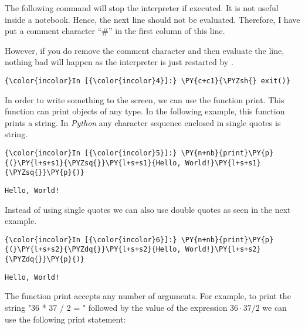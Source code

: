 The following command will stop the interpreter if executed. It is not
useful inside a  notebook. 
Hence, the next line should not be evaluated. Therefore, I have put a
comment character ``\#'' in the first column of this line.

However, if you do remove the comment character and then evaluate the
line, nothing bad will happen as the interpreter is just restarted by
.

\begin{Verbatim}[commandchars=\\\{\}]
{\color{incolor}In [{\color{incolor}4}]:} \PY{c+c1}{\PYZsh{} exit()}
\end{Verbatim}

In order to write something to the screen, we can use the function
print. This function can print objects of any type. In the following
example, this function prints a string. In \textsl{Python} any character
sequence enclosed in single quotes is string.

\begin{Verbatim}[commandchars=\\\{\}]
{\color{incolor}In [{\color{incolor}5}]:} \PY{n+nb}{print}\PY{p}{(}\PY{l+s+s1}{\PYZsq{}}\PY{l+s+s1}{Hello, World!}\PY{l+s+s1}{\PYZsq{}}\PY{p}{)}
\end{Verbatim}


\begin{Verbatim}[commandchars=\\\{\}]
Hello, World!
\end{Verbatim}

Instead of using single quotes we can also use double quotes as seen in
the next example.

\begin{Verbatim}[commandchars=\\\{\}]
{\color{incolor}In [{\color{incolor}6}]:} \PY{n+nb}{print}\PY{p}{(}\PY{l+s+s2}{\PYZdq{}}\PY{l+s+s2}{Hello, World!}\PY{l+s+s2}{\PYZdq{}}\PY{p}{)}
\end{Verbatim}


\begin{Verbatim}[commandchars=\\\{\}]
Hello, World!
\end{Verbatim}

The function print accepts any number of arguments. For example, to
print the string "36 * 37 / 2 = " followed by the value of the
expression \(36 \cdot 37 / 2\) we can use the following print statement:

